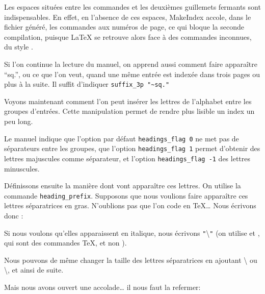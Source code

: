 \begin{attention}
Les espaces situées entre les commandes et les deuxièmes guillemets fermants sont indispensables. En effet, en l'absence de ces espaces, MakeIndex accole, dans le fichier  généré, les commandes aux numéros de page, ce qui bloque la seconde compilation, puisque \LaTeX{} se retrouve alors face à des commandes inconnues, du style .
\end{attention}

Si l'on continue la lecture du manuel, on apprend aussi comment faire apparaître \enquote{sq.}, ou ce que l'on veut, quand une même entrée est indexée dans trois pages ou plus à la suite. Il suffit d'indiquer \verb+suffix_3p "~sq."+

Voyons maintenant comment l'on peut insérer les lettres de l'alphabet entre les groupes d'entrées. Cette manipulation permet de rendre plus lisible un index un peu long. 

Le manuel indique que l'option par défaut \verb+headings_flag 0+ ne met pas de séparateurs entre les groupes, que l'option \verb+headings_flag 1+ permet d'obtenir des lettres majuscules comme séparateur, et l'option  \verb+headings_flag -1+ des lettres minuscules.

Définissons ensuite la manière dont vont apparaître ces lettres. On utilise la commande \verb|heading_prefix|. Supposons que nous voulions faire apparaître ces lettres séparatrices en gras. N'oublions pas que l'on code en \TeX … Nous écrivons donc :

\begin{latexcode}
heading_prefix "{\\bfseries "
\end{latexcode} 

Si nous voulons qu'elles apparaissent en italique, nous écrivons \verb|"|\textbackslash{}\verb|"| (on utilise  et , qui sont des commandes \TeX, et non  ).

Nous  pouvons de même changer la taille des lettres séparatrices en ajoutant \textbackslash{} ou \textbackslash{}, et ainsi de suite. 

Mais nous avons ouvert une accolade… il nous faut la refermer:

\begin{latexcode}
heading_suffix " }\\nopagebreak\n " 
\end{latexcode}

